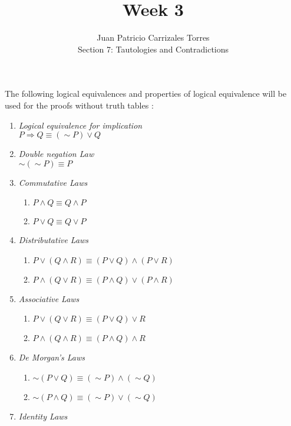 \documentclass[12pt]{article}
\begin{document}
	
	\title{Week 3}
	\author{Juan Patricio Carrizales Torres \\
		Section 7: Tautologies and Contradictions}
	
	\maketitle

The following logical equivalences and properties of logical equivalence will be used for the proofs without truth tables \cite{mathproofs} \cite{logicalequiv}:
\begin{enumerate}
	\item \emph{Logical equivalence for implication} \\
	$P \Rightarrow Q \equiv (\sim P) \vee Q$
	\item \emph{Double negation Law}\\
	$\sim (\sim P) \equiv P$
	\item \emph{Commutative Laws}
	\begin{enumerate}[label = \alph*]
		\item $P \wedge Q \equiv Q \wedge P$
		\item $P \vee Q \equiv Q \vee P$
	\end{enumerate}
	\item \emph{Distributative Laws}
	\begin{enumerate}[label = \alph*]
		\item $P \vee (Q \wedge R) \equiv (P \vee Q) \wedge (P \vee R)$
		\item $P \wedge (Q \vee R) \equiv (P \wedge Q) \vee (P \wedge R)$
	\end{enumerate}
	\item \emph{Associative Laws}
	\begin{enumerate}[label = \alph*]
		\item $P \vee (Q \vee R) \equiv (P \vee Q)\vee R$
		\item $P \wedge (Q \wedge R) \equiv (P \wedge Q) \wedge R$
	\end{enumerate}
	\item \emph{De Morgan's Laws}
	\begin{enumerate}[label = \alph*]
		\item $\sim (P \vee Q) \equiv (\sim P) \wedge (\sim Q)$
		\item $\sim (P \wedge Q) \equiv (\sim P) \vee (\sim Q)$
	\end{enumerate}
	\item \emph{Identity Laws}
	\begin{enumerate}[label = \alph*]

\end{enumerate}
\end{enumerate}
\end{document}
